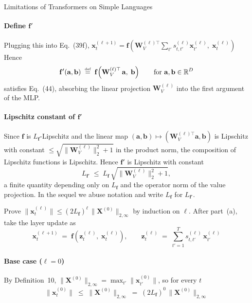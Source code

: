\begin{question}{Limitations of Transformers on Simple Languages}
\begin{subquestion}
    \paragraph{Define $\mathbf{f}'$}
    Plugging this into Eq.~(39f), $\mathbf{x}_t^{(\ell+1)} = \mathbf{f}\!\left(\mathbf{W}_V^{(\ell)\top} \sum_{t'} s_{t,t'}^{(\ell)} \mathbf{x}_{t'}^{(\ell)},\; \mathbf{x}_t^{(\ell)}\right)$
    Hence
    \begin{equation*}
        \mathbf{f}'(\mathbf{a}, \mathbf{b}) \;\mathrel{\stackrel{\textnormal{\tiny def}}{=}}\; \mathbf{f}\!\left(\mathbf{W}_V^{(\ell)\top}\, \mathbf{a},\; \mathbf{b}\right) \qquad \text{for } \mathbf{a}, \mathbf{b} \in \mathbb{R}^{D}
    \end{equation*}
    satisfies Eq.~(44), absorbing the linear projection $\mathbf{W}_V^{(\ell)}$ into the first argument of the MLP.

    \paragraph{Lipschitz constant of $\mathbf{f}'$}
    Since $\mathbf{f}$ is $L_{\mathbf{f}}$-Lipschitz and the linear map $(\mathbf{a}, \mathbf{b}) \mapsto (\mathbf{W}_V^{(\ell)\top}\mathbf{a}, \mathbf{b})$ is Lipschitz with constant $\le \sqrt{\|\mathbf{W}_V^{(\ell)}\|_{2}^{2} + 1}$ in the product norm, the composition of Lipschitz functions is Lipschitz. 
    Hence $\mathbf{f}'$ is Lipschitz with constant
    \begin{equation*}
        L_{\mathbf{f}'} \;\le\; L_{\mathbf{f}}\,\sqrt{\|\mathbf{W}_V^{(\ell)}\|_{2}^{2} + 1},
    \end{equation*}
    a finite quantity depending only on $L_{\mathbf{f}}$ and the operator norm of the value projection. In the sequel we abuse notation and write $L_{\mathbf{f}}$ for $L_{\mathbf{f}'}$.
\end{subquestion}

\begin{subquestion}
    Prove $\|\mathbf{x}_t^{(\ell)}\| \le (2L_{\mathbf{f}})^{\ell}\,\|\mathbf{X}^{(0)}\|_{2,\infty}$ by induction on $\ell$. 
    After part~(a), take the layer update as
    \begin{equation*}
        \mathbf{x}_t^{(\ell+1)} \;=\; \mathbf{f}\!\left(\mathbf{z}_t^{(\ell)},\; \mathbf{x}_t^{(\ell)}\right), \qquad \mathbf{z}_t^{(\ell)} \;=\; \sum_{t'=1}^{T} s_{t,t'}^{(\ell)}\, \mathbf{x}_{t'}^{(\ell)}
    \end{equation*}

    \paragraph{Base case ($\ell = 0$)}
    By Definition~10, $\|\mathbf{X}^{(0)}\|_{2,\infty} = \max_{t'} \|\mathbf{x}_{t'}^{(0)}\|$, so for every $t$
    \begin{equation*}
        \|\mathbf{x}_t^{(0)}\| \;\le\; \|\mathbf{X}^{(0)}\|_{2,\infty} \;=\; (2L_{\mathbf{f}})^{0}\,\|\mathbf{X}^{(0)}\|_{2,\infty}
    \end{equation*}


\end{subquestion}
\end{question}
